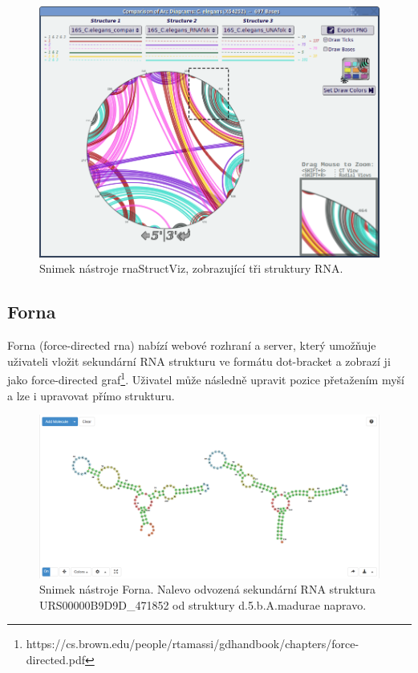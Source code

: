 \begin{figure}[H]
  \centering
  \includegraphics[width=140mm]{../img/kap01/rnaStructViz.png}
  \caption{Snimek nástroje rnaStructViz, zobrazující tři struktury RNA.}
\end{figure}

\subsection{Forna} 

Forna\cite{Forna} (force-directed rna) nabízí webové rozhraní a server, který
umožňuje uživateli vložit sekundární RNA strukturu ve formátu dot-bracket a
zobrazí ji jako force-directed
graf\footnote{https://cs.brown.edu/people/rtamassi/gdhandbook/chapters/force-directed.pdf}.
Uživatel může následně upravit pozice přetažením myší a lze i upravovat přímo
strukturu. 

\begin{figure}[H]
  \centering
  \includegraphics[width=140mm]{../img/kap01/forna.png}
  \caption{Snimek nástroje Forna. Nalevo odvozená sekundární RNA
  struktura URS00000B9D9D\_471852 od struktury d.5.b.A.madurae napravo.}
\end{figure}

